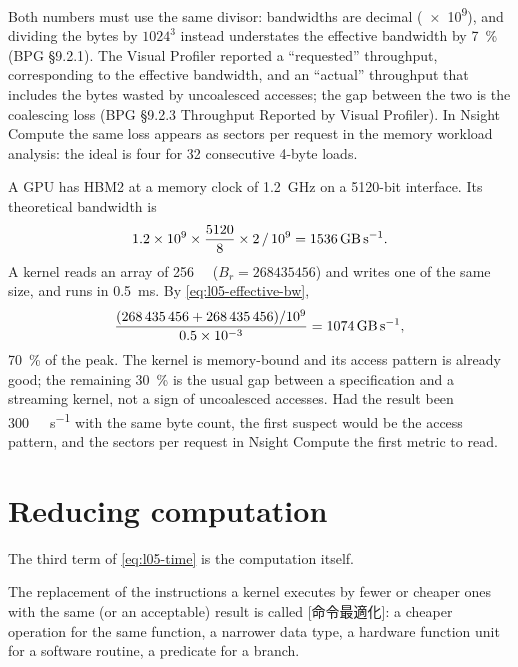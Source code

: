 \documentclass[../main.tex]{subfiles}
\begin{document}
Both numbers must use the same divisor: bandwidths are decimal
(\num{e9}), and dividing the bytes by $1024^3$ instead understates the
effective bandwidth by \SI{7}{\percent} (BPG §9.2.1).  The Visual
Profiler reported a \enquote{requested} throughput, corresponding to the
effective bandwidth, and an \enquote{actual} throughput that includes
the bytes wasted by uncoalesced accesses; the gap between the two is the
coalescing loss (BPG §9.2.3 Throughput Reported by Visual Profiler).  In
Nsight Compute the same loss appears as sectors per request in the
memory workload analysis: the ideal is four for 32 consecutive 4-byte
loads.

\begin{example}
  \label{ex:l05-bandwidth}
  A GPU has HBM2 at a memory clock of \SI{1.2}{\giga\hertz} on a 5120-bit
  interface.  Its theoretical bandwidth is
  \[
    1.2 \times 10^9 \times \frac{5120}{8} \times 2 \,/\, 10^9
    = \SI{1536}{\giga\byte\per\second}.
  \]
  A kernel reads an array of \SI{256}{\mebi\byte}
  ($B_r = \num{268435456}$) and writes one of the same size, and runs in
  \SI{0.5}{\milli\second}.  By \cref{eq:l05-effective-bw},
  \[
    \frac{(\num{268435456} + \num{268435456})/10^9}{0.5 \times 10^{-3}}
    = \SI{1074}{\giga\byte\per\second},
  \]
  \SI{70}{\percent} of the peak.  The kernel is memory-bound and its
  access pattern is already good; the remaining \SI{30}{\percent} is the
  usual gap between a specification and a streaming kernel, not a sign
  of uncoalesced accesses.  Had the result been \SI{300}{\giga\byte\per\second}
  with the same byte count, the first suspect would be the access
  pattern, and the sectors per request in Nsight Compute the first
  metric to read.
\end{example}

\section{Reducing computation}
\label{sec:l05-compute}

The third term of \cref{eq:l05-time} is the computation
itself.

\begin{definition}
  The replacement of the instructions a kernel executes by fewer or
  cheaper ones with the same (or an acceptable) result is called
  [命令最適化]: a cheaper operation for the same function,
  a narrower data type, a hardware function unit for a software routine,
  a predicate for a branch.
\end{definition}
\end{document}
